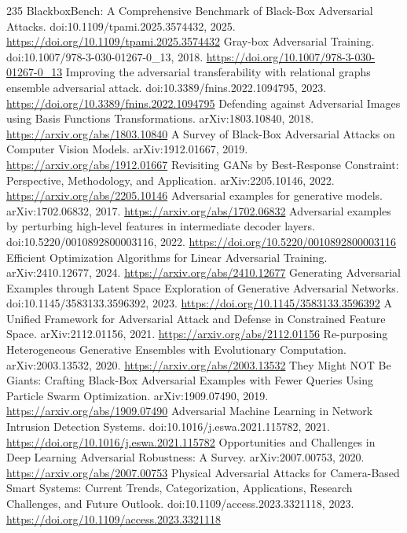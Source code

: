 \documentclass[11pt]{article}
\begin{document}
\begin{thebibliography}{235}
 BlackboxBench: A Comprehensive Benchmark of Black-Box Adversarial Attacks. doi:10.1109/tpami.2025.3574432, 2025. \url{https://doi.org/10.1109/tpami.2025.3574432}
 Gray-box Adversarial Training. doi:10.1007/978-3-030-01267-0\_13, 2018. \url{https://doi.org/10.1007/978-3-030-01267-0_13}
 Improving the adversarial transferability with relational graphs ensemble adversarial attack. doi:10.3389/fnins.2022.1094795, 2023. \url{https://doi.org/10.3389/fnins.2022.1094795}
 Defending against Adversarial Images using Basis Functions Transformations. arXiv:1803.10840, 2018. \url{https://arxiv.org/abs/1803.10840}
 A Survey of Black-Box Adversarial Attacks on Computer Vision Models. arXiv:1912.01667, 2019. \url{https://arxiv.org/abs/1912.01667}
 Revisiting GANs by Best-Response Constraint: Perspective, Methodology, and Application. arXiv:2205.10146, 2022. \url{https://arxiv.org/abs/2205.10146}
 Adversarial examples for generative models. arXiv:1702.06832, 2017. \url{https://arxiv.org/abs/1702.06832}
 Adversarial examples by perturbing high-level features in intermediate decoder layers. doi:10.5220/0010892800003116, 2022. \url{https://doi.org/10.5220/0010892800003116}
 Efficient Optimization Algorithms for Linear Adversarial Training. arXiv:2410.12677, 2024. \url{https://arxiv.org/abs/2410.12677}
 Generating Adversarial Examples through Latent Space Exploration of Generative Adversarial Networks. doi:10.1145/3583133.3596392, 2023. \url{https://doi.org/10.1145/3583133.3596392}
 A Unified Framework for Adversarial Attack and Defense in Constrained Feature Space. arXiv:2112.01156, 2021. \url{https://arxiv.org/abs/2112.01156}
 Re-purposing Heterogeneous Generative Ensembles with Evolutionary Computation. arXiv:2003.13532, 2020. \url{https://arxiv.org/abs/2003.13532}
 They Might NOT Be Giants: Crafting Black-Box Adversarial Examples with Fewer Queries Using Particle Swarm Optimization. arXiv:1909.07490, 2019. \url{https://arxiv.org/abs/1909.07490}
 Adversarial Machine Learning in Network Intrusion Detection Systems. doi:10.1016/j.eswa.2021.115782, 2021. \url{https://doi.org/10.1016/j.eswa.2021.115782}
 Opportunities and Challenges in Deep Learning Adversarial Robustness: A Survey. arXiv:2007.00753, 2020. \url{https://arxiv.org/abs/2007.00753}
 Physical Adversarial Attacks for Camera-Based Smart Systems: Current Trends, Categorization, Applications, Research Challenges, and Future Outlook. doi:10.1109/access.2023.3321118, 2023. \url{https://doi.org/10.1109/access.2023.3321118}

\end{thebibliography}
\end{document}
